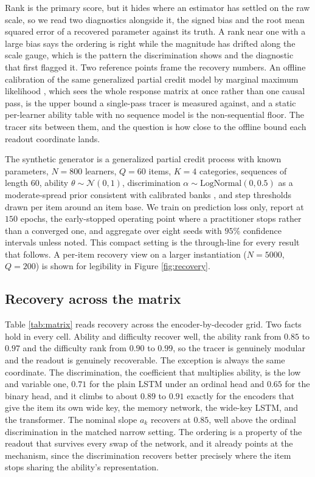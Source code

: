 \documentclass[sigconf,nonacm,screen]{acmart}
\begin{document}
Rank is the primary score, but it hides where an estimator has settled on the raw
scale, so we read two diagnostics alongside it, the signed bias and the root mean
squared error of a recovered parameter against its truth. A rank near one with a
large bias says the ordering is right while the magnitude has drifted along the
scale gauge, which is the pattern the discrimination shows and the diagnostic that
first flagged it. Two reference points frame the recovery numbers. An offline
calibration of the same generalized partial credit model by marginal maximum
likelihood \cite{bock_mle_1981,chalmers_mirt_2012}, which sees the whole response
matrix at once rather than one causal pass, is the upper bound a single-pass tracer
is measured against, and a static per-learner ability table with no sequence model
is the non-sequential floor. The tracer sits between them, and the question is how
close to the offline bound each readout coordinate lands.

The synthetic generator is a generalized partial credit process with known
parameters, $N=800$ learners, $Q=60$ items, $K=4$ categories, sequences of length
$60$, ability $\theta\sim\mathcal{N}(0,1)$, discrimination
$\alpha\sim\mathrm{LogNormal}(0,0.5)$ as a moderate-spread prior consistent with
calibrated banks \cite{de_ayala_theory_2009}, and step thresholds drawn per item
around an item base. We train on prediction loss only, report at $150$ epochs, the
early-stopped operating point where a practitioner stops rather than a converged
one, and aggregate over eight seeds with $95\%$ confidence intervals unless noted.
This compact setting is the through-line for every result that follows. A per-item
recovery view on a larger instantiation ($N=5000$, $Q=200$) is shown for legibility
in Figure \ref{fig:recovery}.

\subsection{Recovery across the matrix}
\label{sec:matrix}
Table \ref{tab:matrix} reads recovery across the encoder-by-decoder grid. Two
facts hold in every cell. Ability and difficulty recover well, the ability rank
from $0.85$ to $0.97$ and the difficulty rank from $0.90$ to $0.99$, so the tracer
is genuinely modular and the readout is genuinely recoverable. The exception is
always the same coordinate. The discrimination, the coefficient that multiplies
ability, is the low and variable one, $0.71$ for the plain LSTM under an ordinal
head and $0.65$ for the binary head, and it climbs to about $0.89$ to $0.91$
exactly for the encoders that give the item its own wide key, the memory network,
the wide-key LSTM, and the transformer. The nominal slope $a_k$ recovers at $0.85$,
well above the ordinal discrimination in the matched narrow setting. The ordering
is a property of the readout that survives every swap of the network, and it
already points at the mechanism, since the discrimination recovers better precisely
where the item stops sharing the ability's representation.
\end{document}
